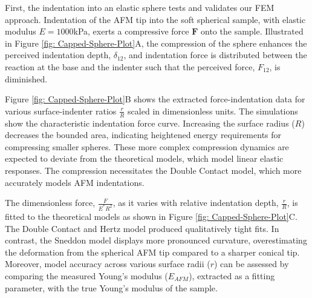 First, the indentation into an elastic sphere tests and validates our FEM approach. Indentation of the AFM tip into the soft spherical sample, with elastic modulus $E = 1000$kPa, exerts a compressive force $\mathbf{F}$ onto the sample. Illustrated in Figure \ref{fig: Capped-Sphere-Plot}A, the compression of the sphere enhances the perceived indentation depth, $\delta_{12}$, and indentation force is distributed between the reaction at the base and the indenter such that the perceived force, $F_{12}$, is diminished. 


Figure \ref{fig: Capped-Sphere-Plot}B shows the extracted force-indentation data for various surface-indenter ratios $\frac{r}{R}$ scaled in dimensionless units. The simulations show the characteristic indentation force curve. Increasing the surface radius ($R$) decreases the bounded area, indicating heightened energy requirements for compressing smaller spheres. These more complex compression dynamics are expected to deviate from the theoretical models, which model linear elastic responses\cite{kontomaris2019determination}. The compression necessitates the Double Contact model, which more accurately models AFM indentations. 


The dimensionless force, $\frac{F}{E^*R^2}$, as it varies with relative indentation depth, $\frac{r}{R}$, is fitted to the theoretical models as shown in Figure \ref{fig: Capped-Sphere-Plot}C. The Double Contact and Hertz model produced qualitatively tight fits. In contrast, the Sneddon model displays more pronounced curvature, overestimating the deformation from the spherical AFM tip compared to a sharper conical tip. Moreover, model accuracy across various surface radii ($r$) can be assessed by comparing the measured Young's modulus ($E_{AFM}$), extracted as a fitting parameter\cite{sun2021determination, DIMITRIADIS20022798, kontomaris2019determination}, with the true Young's modulus of the sample. 

